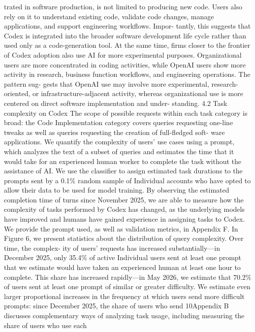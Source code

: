 trated in software production, is not limited to producing new code. Users also rely on it to understand
existing code, validate code changes, manage applications, and support engineering workflows. Impor-
tantly, this suggests that Codex is integrated into the broader software development life cycle rather
than used only as a code-generation tool.
At the same time, firms closer to the frontier of Codex adoption also use AI for more experimental
purposes. Organizational users are more concentrated in coding activities, while OpenAI users show
more activity in research, business function workflows, and engineering operations. The pattern sug-
gests that OpenAI use may involve more experimental, research-oriented, or infrastructure-adjacent
activity, whereas organizational use is more centered on direct software implementation and under-
standing.
4.2
Task complexity on Codex
The scope of possible requests within each task category is broad: the Code Implementation category
covers queries requesting one-line tweaks as well as queries requesting the creation of full-fledged soft-
ware applications. We quantify the complexity of users’ use cases using a prompt, which analyzes the
text of a subset of queries and estimates the time that it would take for an experienced human worker to
complete the task without the assistance of AI. We use the classifier to assign estimated task durations to
the prompts sent by a 0.1\% random sample of Individual accounts who have opted to allow their data to
be used for model training. By observing the estimated completion time of turns since November 2025,
we are able to measure how the complexity of tasks performed by Codex has changed, as the underlying
models have improved and humans have gained experience in assigning tasks to Codex. We provide
the prompt used, as well as validation metrics, in Appendix F.
In Figure 6, we present statistics about the distribution of query complexity. Over time, the complex-
ity of users’ requests has increased substantially—in December 2025, only 35.4\% of active Individual
users sent at least one prompt that we estimate would have taken an experienced human at least one
hour to complete. This share has increased rapidly—in May 2026, we estimate that 70.2\% of users sent
at least one prompt of similar or greater difficulty. We estimate even larger proportional increases in the
frequency at which users send more difficult prompts: since December 2025, the share of users who send
10Appendix B discusses complementary ways of analyzing task usage, including measuring the share of users who use each
